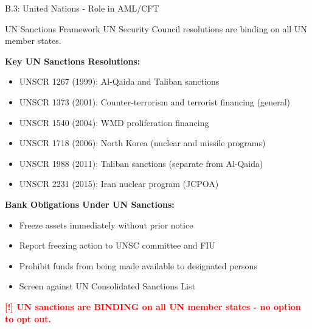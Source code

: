 \documentclass[11pt,a4paper]{beamer}
\newcommand{\redflag}[1]{\textcolor{red}{\textbf{[!] #1}}}
\begin{document}
	\begin{frame}{B.3: United Nations - Role in AML/CFT}
		\begin{block}{UN Sanctions Framework}
			UN Security Council resolutions are binding on all UN member states.
		\end{block}
		\textbf{Key UN Sanctions Resolutions:}
		\begin{itemize}
			\item UNSCR 1267 (1999): Al-Qaida and Taliban sanctions
			\item UNSCR 1373 (2001): Counter-terrorism and terrorist financing (general)
			\item UNSCR 1540 (2004): WMD proliferation financing
			\item UNSCR 1718 (2006): North Korea (nuclear and missile programs)
			\item UNSCR 1988 (2011): Taliban sanctions (separate from Al-Qaida)
			\item UNSCR 2231 (2015): Iran nuclear program (JCPOA)
		\end{itemize}
		\textbf{Bank Obligations Under UN Sanctions:}
		\begin{itemize}
			\item Freeze assets immediately without prior notice
			\item Report freezing action to UNSC committee and FIU
			\item Prohibit funds from being made available to designated persons
			\item Screen against UN Consolidated Sanctions List
		\end{itemize}
		\redflag{UN sanctions are BINDING on all UN member states - no option to opt out.}
	\end{frame}
	
\end{document}
